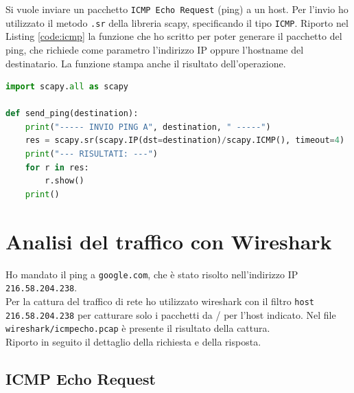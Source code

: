\documentclass[12pt,a4paper]{report}
\begin{document}
Si vuole inviare un pacchetto \texttt{ICMP Echo Request} (ping) a un host. Per l'invio ho utilizzato il metodo \texttt{.sr} della libreria scapy, specificando il tipo \texttt{ICMP}. Riporto nel Listing \ref{code:icmp} la funzione che ho scritto per poter generare il pacchetto del ping, che richiede come parametro l'indirizzo IP oppure l'hostname del destinatario. La funzione stampa anche il risultato dell'operazione.

\begin{lstlisting}[language=Python, caption={Funzione python per la generazione di un pacchetto \texttt{ICMP Echo Request}}, label={code:icmp}]
import scapy.all as scapy

def send_ping(destination):
    print("----- INVIO PING A", destination, " -----")
    res = scapy.sr(scapy.IP(dst=destination)/scapy.ICMP(), timeout=4) 
    print("--- RISULTATI: ---")
    for r in res:
        r.show()
    print()
\end{lstlisting}

\section{Analisi del traffico con Wireshark}
Ho mandato il ping a \texttt{google.com}, che è stato risolto nell'indirizzo IP \texttt{216.58.204.238}.\\
Per la cattura del traffico di rete ho utilizzato wireshark con il filtro \texttt{host 216.58.204.238} per catturare solo i pacchetti da / per l'host indicato. Nel file \texttt{wireshark/icmp{\textunderscore}echo.pcap} è presente il risultato della cattura. \\
Riporto in seguito il dettaglio della richiesta e della risposta.

\subsection{ICMP Echo Request}
\label{subsection:ICMPEchoRequest}
\end{document}
